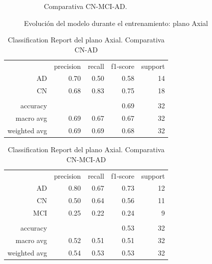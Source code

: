 \begin{figure}[H]
\begin{subfigure}{0.4\textwidth}
        \caption{Comparativa CN-MCI-AD. }
        \label{fig:axial-c-mci-ad}
    \end{subfigure}
    \caption{Evolución del modelo durante el entrenamiento: plano Axial} \label{fig:axial-model}
\end{figure}

\begin{table}[H]
    \centering
    \begin{tabular}{r r r r r}
        & precision & recall & f1-score & support \\
        AD & 0.70 & 0.50 & 0.58 & 14 \\
        CN & 0.68 & 0.83 & 0.75 & 18 \\
        & & & & \\
        accuracy &  &  & 0.69 & 32 \\
        macro avg & 0.69 & 0.67 & 0.67 & 32 \\
        weighted avg & 0.69 & 0.69 & 0.68 & 32 \\
    \end{tabular}
    \caption{Classification Report del plano Axial. Comparativa CN-AD}
    \label{tab:cr-axial-cn-ad}
\end{table}

\begin{table}[H]
    \centering
    \begin{tabular}{r r r r r}
        & precision & recall & f1-score & support \\
        AD & 0.80 & 0.67 & 0.73 & 12 \\
        CN & 0.50 & 0.64 & 0.56 & 11 \\
        MCI & 0.25 & 0.22 & 0.24 & 9 \\
        & & & & \\
        accuracy &  &  & 0.53 & 32 \\
        macro avg & 0.52 & 0.51 & 0.51 & 32 \\
        weighted avg & 0.54 & 0.53 & 0.53 & 32 \\
    \end{tabular}
    \caption{Classification Report del plano Axial. Comparativa CN-MCI-AD}
    \label{tab:cr-axial-cn-mci-ad}
\end{table}

